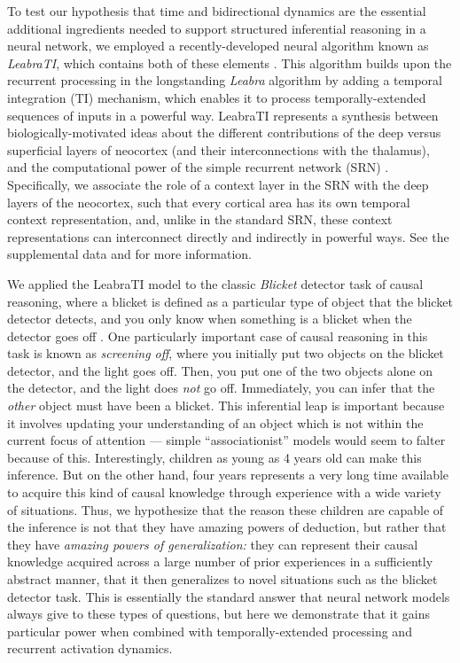 \documentclass[11pt,twoside]{article}
\newif\myifpdf
\begin{document}
To test our hypothesis that time and bidirectional dynamics are the essential additional ingredients needed to support structured inferential reasoning in a neural network, we employed a recently-developed neural algorithm known as {\em LeabraTI}, which contains both of these elements \cite{OReillyWyatteRohrlichIP}.  This algorithm builds upon the recurrent processing in the longstanding {\em Leabra} algorithm \cite{OReillyMunakataFrankEtAl12,OReillyMunakata00} by adding a temporal integration (TI) mechanism, which enables it to process temporally-extended sequences of inputs in a powerful way.  LeabraTI represents a synthesis between biologically-motivated ideas about the different contributions of the deep versus superficial layers of neocortex (and their interconnections with the thalamus), and the computational power of the simple recurrent network (SRN) \cite{Elman90,Elman91,Jordan89}.  Specifically, we associate the role of a context layer in the SRN with the deep layers of the neocortex, such that every cortical area has its own temporal context representation, and, unlike in the standard SRN, these context representations can interconnect directly and indirectly in powerful ways.  See the supplemental data and \cite{OReillyWyatteRohrlichIP} for more information.

We applied the LeabraTI model to the classic {\em Blicket} detector task of causal reasoning, where a blicket is defined as a particular type of object that the blicket detector detects, and you only know when something is a blicket when the detector goes off \cite{GopnikSobel00,SobelTenenbaumGopnik04,LucasGriffiths10,McClellandThompson07}.  One particularly important case of causal reasoning in this task is known as {\em screening off}, where you initially put two objects on the blicket detector, and the light goes off.  Then, you put one of the two objects alone on the detector, and the light does {\em not} go off.  Immediately, you can infer that the {\em other} object must have been a blicket.  This inferential leap is important because it involves updating your understanding of an object which is not within the current focus of attention --- simple ``associationist'' models would seem to falter because of this.  Interestingly, children as young as 4 years old can make this inference.  But on the other hand, four years represents a very long time available to acquire this kind of causal knowledge through experience with a wide variety of situations.  Thus, we hypothesize that the reason these children are capable of the inference is not that they have amazing powers of deduction, but rather that they have {\em amazing powers of generalization:} they can represent their causal knowledge acquired across a large number of prior experiences in a sufficiently abstract manner, that it then generalizes to novel situations such as the blicket detector task.  This is essentially the standard answer that neural network models always give to these types of questions, but here we demonstrate that it gains particular power when combined with temporally-extended processing and recurrent activation dynamics.
\end{document}
